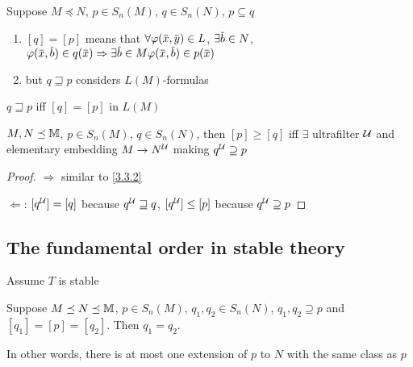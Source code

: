 \documentclass[11pt]{article}
\begin{document}
\begin{remark}
Suppose \(M\preceq N\), \(p\in S_n(M)\), \(q\in S_n(N)\), \(p\subseteq q\)
\begin{enumerate}
\item \([q]=[p]\)  means
that
\(\forall\varphi(\barx,\bary)\in L\),
\(\exists\barb\in N\), \(\varphi(\barx,\barb)\in q(\barx)\Rightarrow \exists\barb\in M\varphi(\barx,\barb)\in p(\barx)\)
\item but \(q\sqsupseteq p\) considers \(L(M)\)-formulas
\end{enumerate}


\(q\sqsupseteq p\) iff \([q]=[p]\) in \(L(M)\)
\end{remark}

\begin{proposition}[]
\label{3.31.7}
\(M,N\preceq\mathbb{M}\), \(p\in S_n(M)\), \(q\in S_n(N)\), then \([p]\ge[q]\) iff \(\exists\) ultrafilter \(\mathcal{U}\) and
elementary embedding \(M\to N^{\mathcal{U}}\) making \(q^{\mathcal{U}}\supseteq p\)
\end{proposition}

\begin{proof}
\(\Rightarrow\) similar to \ref{3.3.2}

\(\Leftarrow\): \([q^{\mathcal{U}}]=[q]\) because \(q^{\mathcal{U}}\sqsupseteq q\), \([q^{\mathcal{U}}]\le[p]\) because \(q^{\mathcal{U}}\supseteq p\)
\end{proof}
\subsection{The fundamental order in stable theory}
\label{sec:org10bb442}
Assume \(T\) is stable
\begin{lemma}[]
\label{3.31.8}
Suppose \(M\preceq N\preceq\mathbb{M}\), \(p\in S_n(M)\), \(q_1,q_2\in S_n(N)\), \(q_1,q_2\supseteq p\) and \([q_1]=[p]=[q_2]\).
Then \(q_1=q_2\).

In other words, there is at most one extension of \(p\) to \(N\) with the same class as \(p\)
\end{lemma}
\end{document}
